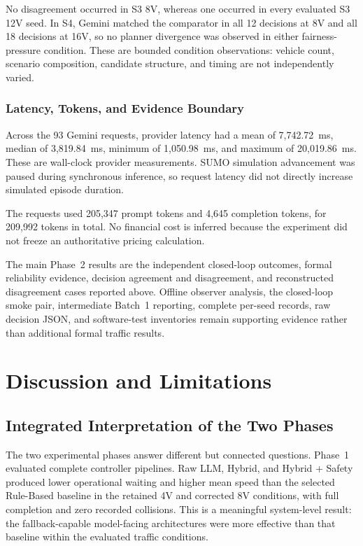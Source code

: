 \documentclass[letterpaper,10pt,conference]{ieeeconf}
\begin{document}
No disagreement occurred in S3 8V, whereas one occurred in every evaluated S3 12V seed. In S4, Gemini matched the comparator in all 12 decisions at 8V and all 18 decisions at 16V, so no planner divergence was observed in either fairness-pressure condition. These are bounded condition observations: vehicle count, scenario composition, candidate structure, and timing are not independently varied.



\subsubsection{Latency, Tokens, and Evidence Boundary}



Across the 93 Gemini requests, provider latency had a mean of 7,742.72~ms, median of 3,819.84~ms, minimum of 1,050.98~ms, and maximum of 20,019.86~ms. These are wall-clock provider measurements. SUMO simulation advancement was paused during synchronous inference, so request latency did not directly increase simulated episode duration.



The requests used 205,347 prompt tokens and 4,645 completion tokens, for 209,992 tokens in total. No financial cost is inferred because the experiment did not freeze an authoritative pricing calculation.



The main Phase~2 results are the independent closed-loop outcomes, formal reliability evidence, decision agreement and disagreement, and reconstructed disagreement cases reported above. Offline observer analysis, the closed-loop smoke pair, intermediate Batch~1 reporting, complete per-seed records, raw decision JSON, and software-test inventories remain supporting evidence rather than additional formal traffic results.



\section{Discussion and Limitations}



\subsection{Integrated Interpretation of the Two Phases}



The two experimental phases answer different but connected questions. Phase~1 evaluated complete controller pipelines. Raw LLM, Hybrid, and Hybrid + Safety produced lower operational waiting and higher mean speed than the selected Rule-Based baseline in the retained 4V and corrected 8V conditions, with full completion and zero recorded collisions. This is a meaningful system-level result: the fallback-capable model-facing architectures were more effective than that baseline within the evaluated traffic conditions.
\end{document}
